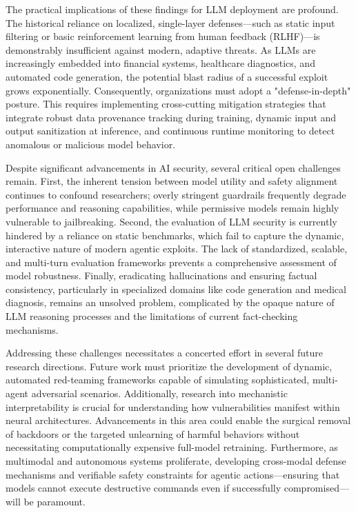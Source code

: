 \documentclass[11pt,a4paper]{article}
\begin{document}
The practical implications of these findings for LLM deployment are profound. The historical reliance on localized, single-layer defenses---such as static input filtering or basic reinforcement learning from human feedback (RLHF)---is demonstrably insufficient against modern, adaptive threats. As LLMs are increasingly embedded into financial systems, healthcare diagnostics, and automated code generation, the potential blast radius of a successful exploit grows exponentially. Consequently, organizations must adopt a "defense-in-depth" posture. This requires implementing cross-cutting mitigation strategies that integrate robust data provenance tracking during training, dynamic input and output sanitization at inference, and continuous runtime monitoring to detect anomalous or malicious model behavior.

Despite significant advancements in AI security, several critical open challenges remain. First, the inherent tension between model utility and safety alignment continues to confound researchers; overly stringent guardrails frequently degrade performance and reasoning capabilities, while permissive models remain highly vulnerable to jailbreaking. Second, the evaluation of LLM security is currently hindered by a reliance on static benchmarks, which fail to capture the dynamic, interactive nature of modern agentic exploits. The lack of standardized, scalable, and multi-turn evaluation frameworks prevents a comprehensive assessment of model robustness. Finally, eradicating hallucinations and ensuring factual consistency, particularly in specialized domains like code generation and medical diagnosis, remains an unsolved problem, complicated by the opaque nature of LLM reasoning processes and the limitations of current fact-checking mechanisms.

Addressing these challenges necessitates a concerted effort in several future research directions. Future work must prioritize the development of dynamic, automated red-teaming frameworks capable of simulating sophisticated, multi-agent adversarial scenarios. Additionally, research into mechanistic interpretability is crucial for understanding how vulnerabilities manifest within neural architectures. Advancements in this area could enable the surgical removal of backdoors or the targeted unlearning of harmful behaviors without necessitating computationally expensive full-model retraining. Furthermore, as multimodal and autonomous systems proliferate, developing cross-modal defense mechanisms and verifiable safety constraints for agentic actions---ensuring that models cannot execute destructive commands even if successfully compromised---will be paramount.
\end{document}
